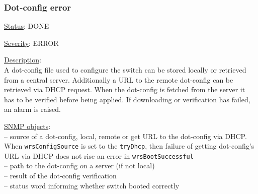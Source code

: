 \subsubsection{\bf Dot-config error}
		\label{fail:other:dot-config}
		\begin{pck_descr}
			\item [] \underline{Status}: DONE
			\item [] \underline{Severity}: ERROR
			\item [] \underline{Description}:\\
				A dot-config file used to configure the switch can be stored locally or
				retrieved from a central server. Additionally a URL to the remote
        dot-config can be retrieved via DHCP request. When the dot-config is
        fetched from the server it has to be verified before being applied. If
        downloading or verification has failed, an alarm is raised.
			\item [] \underline{SNMP objects}:\\
        {\footnotesize
				 -- source of a dot-config,
					local, remote or get URL to the dot-config via DHCP. When
					\texttt{wrsConfigSource} is set to the \texttt{tryDhcp}, then failure of
					getting dot-config's URL via DHCP does not rise an error in
					\texttt{wrsBootSuccessful}\\
				 -- path to the dot-config
					on a server (if not local)\\
				 -- result of the dot-config verification\\
				 -- status word informing
					whether switch booted correctly\\
				\\
         }
		\end{pck_descr}

